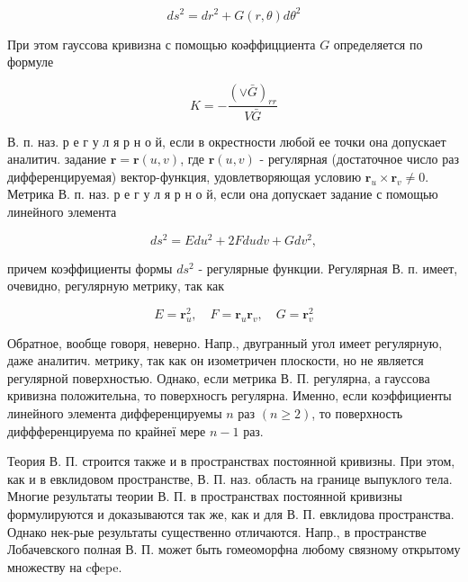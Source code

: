 \documentclass[10pt]{article}
\begin{document}
\[

d s^{2}=d r^{2}+G(r, \theta) d \theta^{2}

\]



При этом гауссова кривизна с помощью коәффицциента $G$ определяется по формуле



\[

K=-\frac{(\vee \bar{G})_{r r}}{V \bar{G}}

\]



В. п. наз. р е г у л я р н о й, если в окрестности любой ее точки она допускает аналитич. задание $\boldsymbol{r}=\boldsymbol{r}(u, v)$, где $\boldsymbol{r}(u, v)$ - регулярная (достаточное число раз дифференцируемая) вектор-функция, удовлетворяющая условию $\boldsymbol{r}_{u} \times \boldsymbol{r}_{v} \neq 0$. Метрика В. п. наз. р е г у л я р н о й, если она допускает задание с помощью линейного элемента



\[

d s^{2}=E d u^{2}+2 F d u d v+G d v^{2},

\]



причем коэффициенты формы $d s^{2}$ - регулярные функции. Регулярная В. п. имеет, очевидно, регулярную метрику, так как



\[

E=\boldsymbol{r}_{u}^{2}, \quad F=\boldsymbol{r}_{u} \boldsymbol{r}_{v}, \quad G=\boldsymbol{r}_{v}^{2}

\]



Обратное, вообще говоря, неверно. Напр., двугранный угол имеет регулярную, даже аналитич. метрику, так как он изометричен плоскости, но не является регулярной поверхностью. Однако, если метрика В. П. регулярна, а гауссова кривизна положительна, то поверхносгь регулярна. Именно, если коэффициенты линейного элемента дифференцируемы $n$ раз $(n \geqslant 2)$, то поверхность диффференцируема по крайнеї мере $n-1$ раз.



Теория В. П. строится также и в пространствах постоянной кривизны. При этом, как и в евклидовом пространстве, В. П. наз. область на границе выпуклого тела. Многие результаты теории В. П. в пространствах постоянной кривизны формулируются и доказываются так же, как и для В. П. евклидова пространства. Однако нек-рые результаты существенно отличаются. Напр., в пространстве Лобачевского полная В. П. может быть гомеоморфна любому связному открытому множеству на cфepe.
\end{document}
